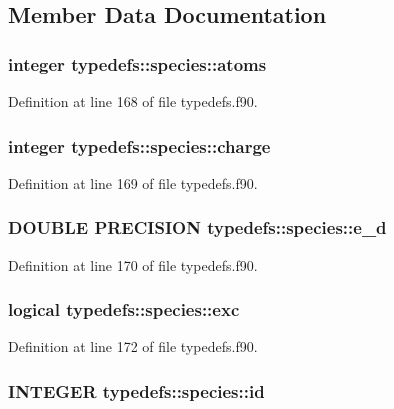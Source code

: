 \subsection{Member Data Documentation}
\hypertarget{typetypedefs_1_1species_ab03f91b8ff8e8eec8c797b1514bb29b0}{
\subsubsection[{atoms}]{\setlength{\rightskip}{0pt plus 5cm}integer {\bf typedefs::species::atoms}}}
\label{typetypedefs_1_1species_ab03f91b8ff8e8eec8c797b1514bb29b0}


Definition at line 168 of file typedefs.f90.\hypertarget{typetypedefs_1_1species_a5dfdb92d0d495f4be8a4d957e74829a0}{
\subsubsection[{charge}]{\setlength{\rightskip}{0pt plus 5cm}integer {\bf typedefs::species::charge}}}
\label{typetypedefs_1_1species_a5dfdb92d0d495f4be8a4d957e74829a0}


Definition at line 169 of file typedefs.f90.\hypertarget{typetypedefs_1_1species_a72f4e823e9eebde3d106419b851a5c28}{
\subsubsection[{e\_\-d}]{\setlength{\rightskip}{0pt plus 5cm}DOUBLE PRECISION {\bf typedefs::species::e\_\-d}}}
\label{typetypedefs_1_1species_a72f4e823e9eebde3d106419b851a5c28}


Definition at line 170 of file typedefs.f90.\hypertarget{typetypedefs_1_1species_a4e17d0c57396b3272a4c5f20ca437326}{
\subsubsection[{exc}]{\setlength{\rightskip}{0pt plus 5cm}logical {\bf typedefs::species::exc}}}
\label{typetypedefs_1_1species_a4e17d0c57396b3272a4c5f20ca437326}


Definition at line 172 of file typedefs.f90.\hypertarget{typetypedefs_1_1species_af824a2c036c27efd725930e6cb9c491f}{
\subsubsection[{id}]{\setlength{\rightskip}{0pt plus 5cm}INTEGER {\bf typedefs::species::id}}}
\label{typetypedefs_1_1species_af824a2c036c27efd725930e6cb9c491f}


